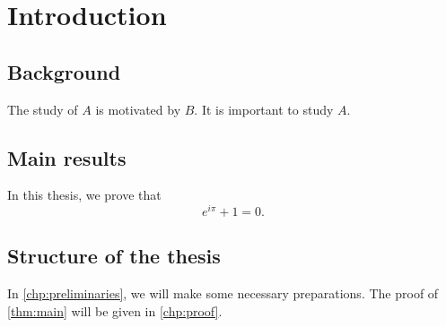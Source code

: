 
\chapter{Introduction} \label{chp:intro}

\section{Background}


The study of $ A $ is motivated by $ B $. It is important to study $ A $.

\section{Main results}
\begin{theorem}\label{thm:main}
	In this thesis, we prove that
	\begin{equation*}
		e^{i\pi}  + 1 = 0.
	\end{equation*}
\end{theorem}


\section{Structure of the thesis}

In \autoref{chp:preliminaries}, we will make some necessary preparations. The proof of \autoref{thm:main} will be given in \autoref{chp:proof}.